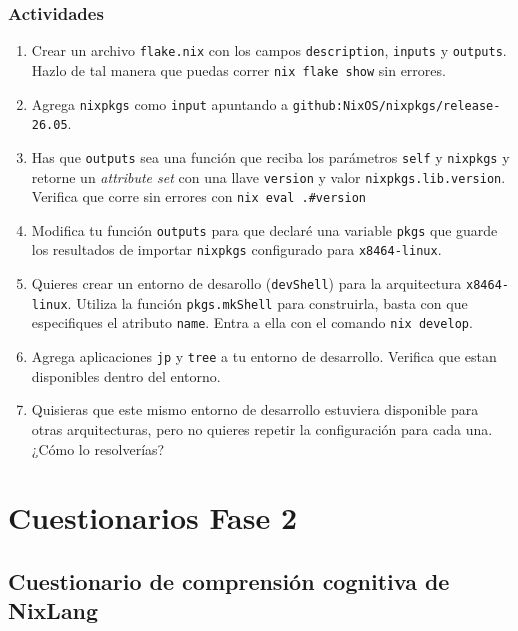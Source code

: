 \subsubsection{Actividades}

\begin{enumerate}
\item Crear un archivo \texttt{flake.nix} con los campos \texttt{description}, \texttt{inputs} y \texttt{outputs}. Hazlo de tal manera que puedas correr \texttt{nix flake show} sin errores.
\item Agrega \texttt{nixpkgs} como \texttt{input} apuntando a \texttt{github:NixOS/\allowbreak{}nixpkgs/\allowbreak{}release-\allowbreak{}26.\allowbreak{}05}.
\item Has que \texttt{outputs} sea una función que reciba los parámetros \texttt{self} y \texttt{nixpkgs} y retorne un \emph{attribute set} con una llave \texttt{version} y valor \texttt{nixpkgs.\allowbreak{}lib.\allowbreak{}version}. Verifica que corre sin errores con \texttt{nix eval .\allowbreak{}\#version}
\item Modifica tu función \texttt{outputs} para que declaré una variable \texttt{pkgs} que guarde los resultados de importar \texttt{nixpkgs} configurado para \texttt{x84\textunderscore{}64-linux}.
\item Quieres crear un entorno de desarollo (\texttt{devShell}) para la arquitectura \texttt{x84\textunderscore{}64-linux}. Utiliza la función \texttt{pkgs.mkShell} para construirla, basta con que especifiques el atributo \texttt{name}. Entra a ella con el comando \texttt{nix develop}.
\item Agrega aplicaciones \texttt{jp} y \texttt{tree} a tu entorno de desarrollo. Verifica que estan disponibles dentro del entorno.
\item Quisieras que este mismo entorno de desarrollo estuviera disponible para otras arquitecturas, pero no quieres repetir la configuración para cada una. ¿Cómo lo resolverías?
\end{enumerate}

\section{Cuestionarios Fase 2}\label{Appendix4}

\subsection{Cuestionario de comprensión cognitiva de NixLang}

